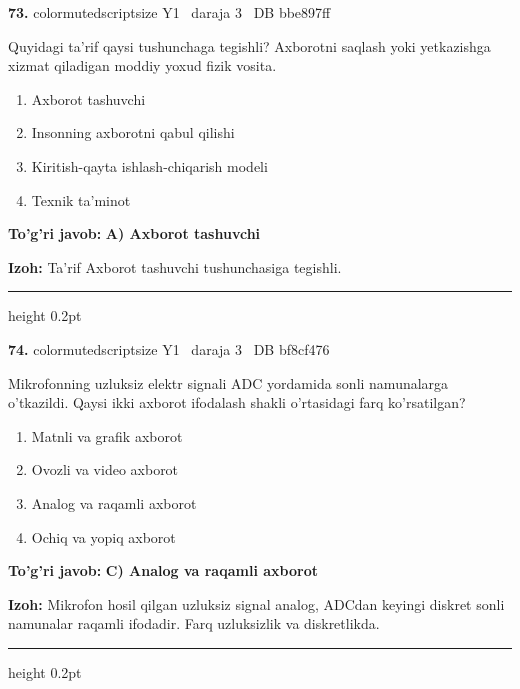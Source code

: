 \documentclass[10pt,a4paper,oneside]{article}
\begin{document}
\noindent\textbf{\color{ink}73.}  {color{muted}scriptsize Y1 \textbullet\ daraja 3 \textbullet\ DB bbe897ff}
\par
Quyidagi ta'rif qaysi tushunchaga tegishli? Axborotni saqlash yoki yetkazishga xizmat qiladigan moddiy yoxud fizik vosita.
\begin{enumerate}[label=\Alph*),leftmargin=9mm]
\item Axborot tashuvchi
\item Insonning axborotni qabul qilishi
\item Kiritish-qayta ishlash-chiqarish modeli
\item Texnik ta'minot
\end{enumerate}
\begin{tcolorbox}[enhanced,breakable,colback=teal!4,colframe=teal!50!black,boxrule=0.5pt,arc=1.1mm,left=3mm,right=3mm,top=1.7mm,bottom=1.7mm,before skip=2mm,after skip=2mm]
\textbf{\color{teal}To'g'ri javob:} \textbf{A) Axborot tashuvchi}
\par\smallskip
\textbf{Izoh:} Ta'rif Axborot tashuvchi tushunchasiga tegishli.
\end{tcolorbox}
\vspace{2mm}\hrule height 0.2pt \vspace{3mm}

\noindent\textbf{\color{ink}74.}  {color{muted}scriptsize Y1 \textbullet\ daraja 3 \textbullet\ DB bf8cf476}
\par
Mikrofonning uzluksiz elektr signali ADC yordamida sonli namunalarga o'tkazildi. Qaysi ikki axborot ifodalash shakli o'rtasidagi farq ko'rsatilgan?
\begin{enumerate}[label=\Alph*),leftmargin=9mm]
\item Matnli va grafik axborot
\item Ovozli va video axborot
\item Analog va raqamli axborot
\item Ochiq va yopiq axborot
\end{enumerate}
\begin{tcolorbox}[enhanced,breakable,colback=teal!4,colframe=teal!50!black,boxrule=0.5pt,arc=1.1mm,left=3mm,right=3mm,top=1.7mm,bottom=1.7mm,before skip=2mm,after skip=2mm]
\textbf{\color{teal}To'g'ri javob:} \textbf{C) Analog va raqamli axborot}
\par\smallskip
\textbf{Izoh:} Mikrofon hosil qilgan uzluksiz signal analog, ADCdan keyingi diskret sonli namunalar raqamli ifodadir. Farq uzluksizlik va diskretlikda.
\end{tcolorbox}
\vspace{2mm}\hrule height 0.2pt \vspace{3mm}
\end{document}
